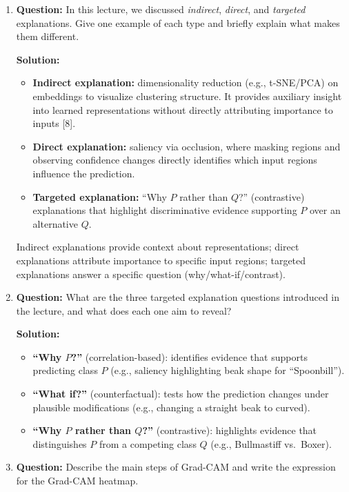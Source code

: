 \documentclass{article}
\renewcommand{\cite}[1]{[#1]}
\begin{document}
\begin{enumerate}

\item \textbf{Question:}  
In this lecture, we discussed \emph{indirect}, \emph{direct}, and \emph{targeted} explanations.  
Give one example of each type and briefly explain what makes them different.

\textbf{Solution:}  
\begin{itemize}
    \item \textbf{Indirect explanation:} dimensionality reduction (e.g., t-SNE/PCA) on embeddings to visualize clustering structure. It provides auxiliary insight into learned representations without directly attributing importance to inputs \cite{8}.
    \item \textbf{Direct explanation:} saliency via occlusion, where masking regions and observing confidence changes directly identifies which input regions influence the prediction.
    \item \textbf{Targeted explanation:} ``Why $P$ rather than $Q$?'' (contrastive) explanations that highlight discriminative evidence supporting $P$ over an alternative $Q$.
\end{itemize}
Indirect explanations provide context about representations; direct explanations attribute importance to specific input regions; targeted explanations answer a specific question (why/what-if/contrast).

\item \textbf{Question:}  
What are the three targeted explanation questions introduced in the lecture, and what does each one aim to reveal?

\textbf{Solution:}  
\begin{itemize}
    \item \textbf{``Why $P$?''} (correlation-based): identifies evidence that supports predicting class $P$ (e.g., saliency highlighting beak shape for ``Spoonbill'').
    \item \textbf{``What if?''} (counterfactual): tests how the prediction changes under plausible modifications (e.g., changing a straight beak to curved).
    \item \textbf{``Why $P$ rather than $Q$?''} (contrastive): highlights evidence that distinguishes $P$ from a competing class $Q$ (e.g., Bullmastiff vs.\ Boxer).
\end{itemize}

\item \textbf{Question:}  
Describe the main steps of Grad-CAM and write the expression for the Grad-CAM heatmap.


\end{enumerate}
\end{document}
